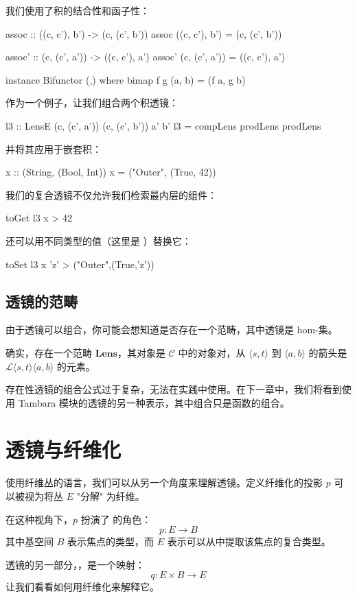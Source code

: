 \documentclass[DaoFP]{subfiles}
\begin{document}
我们使用了积的结合性和函子性：
\begin{haskell}
assoc :: ((c, c'), b') -> (c, (c', b'))
assoc ((c, c'), b') = (c, (c', b'))

assoc' :: (c, (c', a')) -> ((c, c'), a')
assoc' (c, (c', a')) = ((c, c'), a')

instance Bifunctor (,) where
  bimap f g (a, b) = (f a, g b)
\end{haskell}

作为一个例子，让我们组合两个积透镜：
\begin{haskell}
l3 :: LensE (c, (c', a')) (c, (c', b')) a' b'
l3 = compLens prodLens prodLens
\end{haskell}
并将其应用于嵌套积：
\begin{haskell}
x :: (String, (Bool, Int))
x = ("Outer", (True, 42))
\end{haskell}
我们的复合透镜不仅允许我们检索最内层的组件：
\begin{haskell}
toGet l3 x
> 42
\end{haskell}
还可以用不同类型的值（这里是 ）替换它：
\begin{haskell}
toSet l3 x 'z'
> ("Outer",(True,'z'))
\end{haskell}

\subsection{透镜的范畴}

由于透镜可以组合，你可能会想知道是否存在一个范畴，其中透镜是 hom-集。

确实，存在一个范畴 $\mathbf{Lens}$，其对象是 $\mathcal{C}$ 中的对象对，从 $\langle s, t\rangle$ 到 $ \langle a, b \rangle$ 的箭头是 $\mathcal{L} \langle s, t\rangle \langle a, b \rangle$ 的元素。

存在性透镜的组合公式过于复杂，无法在实践中使用。在下一章中，我们将看到使用 Tambara 模块的透镜的另一种表示，其中组合只是函数的组合。

\section{透镜与纤维化}

使用纤维丛的语言，我们可以从另一个角度来理解透镜。定义纤维化的投影 $p$ 可以被视为将丛 $E$ "分解" 为纤维。

在这种视角下，$p$ 扮演了  的角色：
\[ p \colon E \to B \]
其中基空间 $B$ 表示焦点的类型，而 $E$ 表示可以从中提取该焦点的复合类型。

透镜的另一部分，，是一个映射：
\[ q \colon E \times B \to E \]
让我们看看如何用纤维化来解释它。
\end{document}
